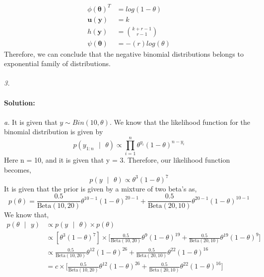 \documentclass[11pt]{article}
\begin{document}
\begin{equation}
  \nonumber
  \begin{aligned}
    \phi(\bm{\theta})^{T} & = log(1 - \theta)\\
    \mathbf{u(y)} & = k\\
    h(\mathbf{y}) & = {k + r - 1 \choose r - 1}\\
    \psi(\bm{\theta}) & = -(r)log(\theta)
  \end{aligned}
\end{equation}
Therefore, we can conclude that the negative binomial distributions belongs to exponential family of distributions.\\ \\
\emph{3.}\\ \\
\textbf{Solution:} \\ \\
\emph{a.} It is given that $y \sim Bin(10, \theta)$. We know that the likelihood function for the binomial distribution is given by
\begin{equation}
  \nonumber
  p(y_{1:n} \text{ }|\text{ } \theta) \propto \prod_{i = 1}^{n} \theta^{y_{i}}(1 - \theta)^{n-y_{i}}
\end{equation}
Here n = 10, and it is given that y = 3. Therefore, our likelihood function becomes,
\begin{equation}
  \nonumber
  p(y \text{ }|\text{ } \theta)  \propto \theta^{3}(1 - \theta)^{7}
\end{equation}
It is given that the prior is given by a mixture of two beta's as,
\begin{equation}
  \nonumber
  p(\theta) = \frac{0.5}{\text{Beta}(10,20)}\theta^{10-1}(1-\theta)^{20-1} + \frac{0.5}{\text{Beta}(20,10)}\theta^{20-1}(1-\theta)^{10-1}
\end{equation}
We know that,
\begin{equation}
  \nonumber
  \begin{aligned}
    p(\theta \text{ }|\text{ } y) & \propto p(y \text{ }|\text{ } \theta) \times p(\theta)\\
    & \propto [\theta^{3}(1 - \theta)^{7}] \times \bigg[\frac{0.5}{\text{Beta}(10,20)}\theta^{9}(1-\theta)^{19} + \frac{0.5}{\text{Beta}(20,10)}\theta^{19}(1-\theta)^{9}\bigg]\\
    & \propto \frac{0.5}{\text{Beta}(10,20)}\theta^{12}(1-\theta)^{26} + \frac{0.5}{\text{Beta}(20,10)}\theta^{22}(1-\theta)^{16}\\
    & = c \times \bigg[\frac{0.5}{\text{Beta}(10,20)}\theta^{12}(1-\theta)^{26} + \frac{0.5}{\text{Beta}(20,10)}\theta^{22}(1-\theta)^{16}\bigg]
  \end{aligned}
\end{equation}
\end{document}
